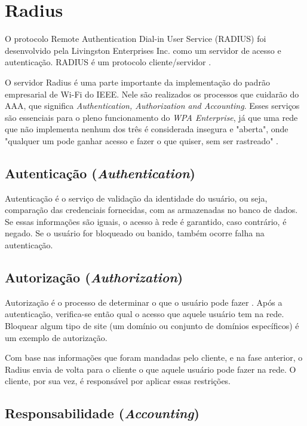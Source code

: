 \section{Radius}

O protocolo Remote Authentication Dial-in User Service (RADIUS) foi desenvolvido pela
Livingston Enterprises Inc. como um servidor de acesso e autenticação. RADIUS é um
protocolo cliente/servidor \cite{radius-guide}.


O servidor Radius é uma parte importante da implementação do padrão empresarial
de Wi-Fi do IEEE. Nele são realizados os processos que cuidarão do AAA, que significa
\textit{Authentication, Authorization and Accounting}. Esses serviços são essenciais
para o pleno funcionamento do \textit{WPA Enterprise}, já que uma rede que não implementa
nenhum dos três é considerada insegura e "aberta", onde "qualquer um pode ganhar
acesso e fazer o que quiser, sem ser rastreado" \cite{radius-guide}.

\subsection{Autenticação (\textit{Authentication})}

Autenticação é o serviço de validação da identidade do usuário, ou seja, comparação
das credenciais fornecidas, com as armazenadas no banco de dados. Se essas informações
são iguais, o acesso à rede é garantido, caso contrário, é negado. Se o usuário for
bloqueado ou banido, também ocorre falha na autenticação. \cite{radius-guide}


\subsection{Autorização (\textit{Authorization})}

Autorização é o processo de determinar o que o usuário pode fazer \cite{radius-guide}. Após a
autenticação, verifica-se então qual o acesso que aquele usuário tem na rede. Bloquear
algum tipo de site (um domínio ou conjunto de domínios específicos) é um exemplo
de autorização.

Com base nas informações que foram mandadas pelo cliente, e na fase anterior, o Radius
envia de volta para o cliente o que aquele usuário pode fazer na rede. O cliente,
por sua vez, é responsável por aplicar essas restrições. \cite{radius-guide}

\subsection{Responsabilidade (\textit{Accounting})}

